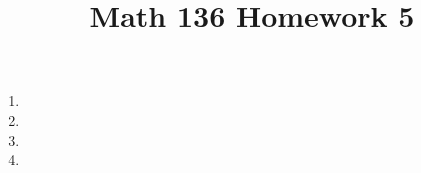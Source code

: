\documentclass{article}
\title{Math 136 Homework 5}
\begin{document}
    \maketitle
    \begin{enumerate}
      \item 
      \item 
      \item 
      \item 
    \end{enumerate}
\end{document}
